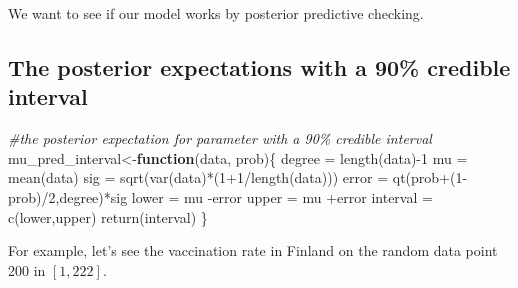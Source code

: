 \documentclass[
]{article}
\newenvironment{Shaded}{\begin{snugshade}}{\end{snugshade}}
\newcommand{\AttributeTok}[1]{\textcolor[rgb]{0.77,0.63,0.00}{#1}}
\newcommand{\CommentTok}[1]{\textcolor[rgb]{0.56,0.35,0.01}{\textit{#1}}}
\newcommand{\ControlFlowTok}[1]{\textcolor[rgb]{0.13,0.29,0.53}{\textbf{#1}}}
\newcommand{\DecValTok}[1]{\textcolor[rgb]{0.00,0.00,0.81}{#1}}
\newcommand{\FloatTok}[1]{\textcolor[rgb]{0.00,0.00,0.81}{#1}}
\newcommand{\FunctionTok}[1]{\textcolor[rgb]{0.00,0.00,0.00}{#1}}
\newcommand{\NormalTok}[1]{#1}
\newcommand{\OtherTok}[1]{\textcolor[rgb]{0.56,0.35,0.01}{#1}}
\newcommand{\SpecialCharTok}[1]{\textcolor[rgb]{0.00,0.00,0.00}{#1}}
\newcommand{\StringTok}[1]{\textcolor[rgb]{0.31,0.60,0.02}{#1}}
\begin{document}
We want to see if our model works by posterior predictive checking.

\hypertarget{the-posterior-expectations-with-a-90-credible-interval}{%
\subsection{The posterior expectations with a 90\% credible
interval}\label{the-posterior-expectations-with-a-90-credible-interval}}

\begin{Shaded}
\begin{Highlighting}[]
\CommentTok{\#the posterior expectation for parameter with a 90\% credible interval}
\NormalTok{mu\_pred\_interval}\OtherTok{\textless{}{-}}\ControlFlowTok{function}\NormalTok{(data, prob)\{}
\NormalTok{degree }\OtherTok{=} \FunctionTok{length}\NormalTok{(data)}\SpecialCharTok{{-}}\DecValTok{1}
\NormalTok{mu }\OtherTok{=} \FunctionTok{mean}\NormalTok{(data)}
\NormalTok{sig }\OtherTok{=} \FunctionTok{sqrt}\NormalTok{(}\FunctionTok{var}\NormalTok{(data)}\SpecialCharTok{*}\NormalTok{(}\DecValTok{1}\SpecialCharTok{+}\DecValTok{1}\SpecialCharTok{/}\FunctionTok{length}\NormalTok{(data)))}
\NormalTok{error }\OtherTok{=} \FunctionTok{qt}\NormalTok{(prob}\SpecialCharTok{+}\NormalTok{(}\DecValTok{1}\SpecialCharTok{{-}}\NormalTok{prob)}\SpecialCharTok{/}\DecValTok{2}\NormalTok{,degree)}\SpecialCharTok{*}\NormalTok{sig}
\NormalTok{lower }\OtherTok{=}\NormalTok{ mu }\SpecialCharTok{{-}}\NormalTok{error}
\NormalTok{upper }\OtherTok{=}\NormalTok{ mu }\SpecialCharTok{+}\NormalTok{error}
\NormalTok{interval }\OtherTok{=} \FunctionTok{c}\NormalTok{(lower,upper)}
\FunctionTok{return}\NormalTok{(interval)}
\NormalTok{\}}
\end{Highlighting}
\end{Shaded}

For example, let's see the vaccination rate in Finland on the random
data point 200 in \([1,222]\).

\begin{Shaded}
\end{Shaded}
\end{document}
